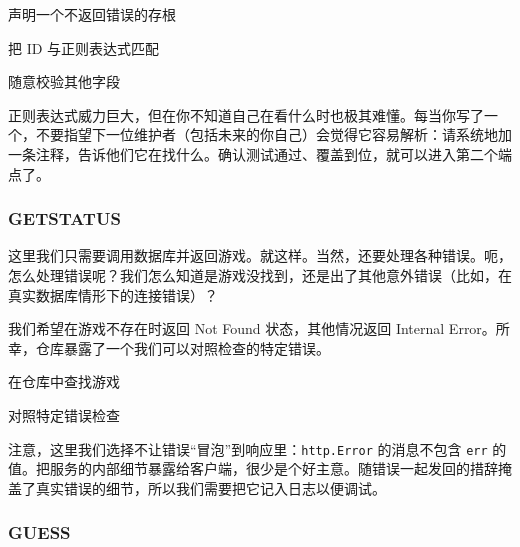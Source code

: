 \begin{codeannotations}
\item 声明一个不返回错误的存根
\item 把 ID 与正则表达式匹配
\item 随意校验其他字段
\end{codeannotations}

正则表达式威力巨大，但在你不知道自己在看什么时也极其难懂。每当你写了一个，不要指望下一位维护者（包括未来的你自己）会觉得它容易解析：请系统地加一条注释，告诉他们它在找什么。确认测试通过、覆盖到位，就可以进入第二个端点了。

\subsubsection*{GETSTATUS}

这里我们只需要调用数据库并返回游戏。就这样。当然，还要处理各种错误。呃，怎么处理错误呢？我们怎么知道是游戏没找到，还是出了其他意外错误（比如，在真实数据库情形下的连接错误）？

我们希望在游戏不存在时返回 Not Found 状态，其他情况返回 Internal Error。所幸，仓库暴露了一个我们可以对照检查的特定错误。


\begin{codeannotations}
\item 在仓库中查找游戏
\item 对照特定错误检查
\end{codeannotations}

注意，这里我们选择不让错误``冒泡''到响应里：\texttt{http.Error} 的消息不包含 \texttt{err} 的值。把服务的内部细节暴露给客户端，很少是个好主意。随错误一起发回的措辞掩盖了真实错误的细节，所以我们需要把它记入日志以便调试。

\subsubsection*{GUESS}

